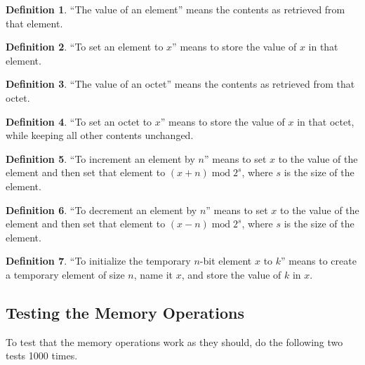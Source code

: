 \documentclass[a4paper,12pt]{article}
\DeclareMathOperator{\MOD}{mod}
\newcommand{\modulo}[2]{#1 \MOD #2}
\theoremstyle{definition}
\newtheorem{definition}{Definition}
\begin{document}
\begin{definition}
``The value of an element'' means the contents as retrieved from that element.
\end{definition}

\begin{definition}
``To set an element to $x$'' means to store the value of $x$ in that element.
\end{definition}

\begin{definition}
``The value of an octet'' means the contents as retrieved from that octet.
\end{definition}

\begin{definition}
``To set an octet to $x$'' means to store the value of $x$ in that octet, while keeping all other contents unchanged.
\end{definition}

\begin{definition}
``To increment an element by $n$'' means to set $x$ to the value of the element and then set that element to $\modulo{(x + n)}{2^s}$, where $s$ is the size of the element.
\end{definition}

\begin{definition}
``To decrement an element by $n$'' means to set $x$ to the value of the element and then set that element to $\modulo{(x - n)}{2^s}$, where $s$ is the size of the element.
\end{definition}

\begin{definition}
``To initialize the temporary $n$-bit element $x$ to $k$'' means to create a temporary element of size $n$, name it $x$, and store the value of $k$ in $x$.
\end{definition}

\subsection{Testing the Memory Operations}

To test that the memory operations work as they should, do the following two tests 1000 times.
\end{document}
